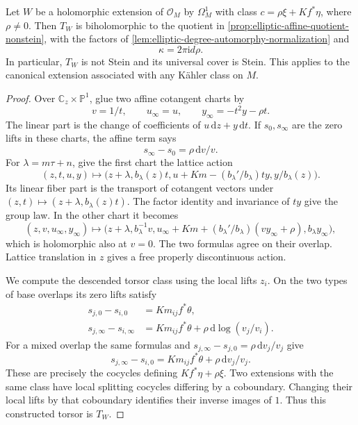 \begin{theorem}\label{thm:split-elliptic-cotangent-torsor}
Let $W$ be a holomorphic extension of $\mathcal O_M$ by $\Omega_M^1$ with class $c=\rho\xi+Kf^*\eta$, where $\rho\ne0$. Then $T_W$ is biholomorphic to the quotient in \cref{prop:elliptic-affine-quotient-nonstein}, with the factors of \cref{lem:elliptic-degree-automorphy-normalization} and
\[
 \kappa=2\pi\mathrm{i}d\rho.
\]
In particular, $T_W$ is not Stein and its universal cover is Stein. This applies to the canonical extension associated with any K\"ahler class on $M$.
\end{theorem}
\begin{proof}
Over $\mathbb C_z\times\mathbb P^1$, glue two affine cotangent charts by
\[
 v=1/t,\qquad u_\infty=u,\qquad
 y_\infty=-t^2y-\rho t.
\]
The linear part is the change of coefficients of $u\,\mathrm{d}z+y\,\mathrm{d}t$. If $s_0,s_\infty$ are the zero lifts in these charts, the affine term says
\[
 s_\infty-s_0=\rho\,\mathrm{d}v/v.
\]
For $\lambda=m\tau+n$, give the first chart the lattice action
\[
 (z,t,u,y)\longmapsto
 \bigl(z+\lambda,b_\lambda(z)t,
 u+Km-(b_\lambda'/b_\lambda)ty,y/b_\lambda(z)\bigr).
\]
Its linear fiber part is the transport of cotangent vectors under $(z,t)\mapsto(z+\lambda,b_\lambda(z)t)$. The factor identity and invariance of $ty$ give the group law. In the other chart it becomes
\[
 (z,v,u_\infty,y_\infty)\longmapsto
 \bigl(z+\lambda,b_\lambda^{-1}v,
 u_\infty+Km+(b_\lambda'/b_\lambda)(v y_\infty+\rho),
 b_\lambda y_\infty\bigr),
\]
which is holomorphic also at $v=0$. The two formulas agree on their overlap. Lattice translation in $z$ gives a free properly discontinuous action.

We compute the descended torsor class using the local lifts $z_i$. On the two types of base overlaps its zero lifts satisfy
\[
 \begin{aligned}
 s_{j,0}-s_{i,0}&=Km_{ij}f^*\theta,\\
 s_{j,\infty}-s_{i,\infty}
   &=Km_{ij}f^*\theta+\rho\,\mathrm{d}\log(v_j/v_i).
 \end{aligned}
\]
For a mixed overlap the same formulas and $s_{j,\infty}-s_{j,0}=\rho\,\mathrm{d}v_j/v_j$ give
\[
 s_{j,\infty}-s_{i,0}=Km_{ij}f^*\theta+\rho\,\mathrm{d}v_j/v_j.
\]
These are precisely the cocycles defining $Kf^*\eta+\rho\xi$. Two extensions with the same class have local splitting cocycles differing by a coboundary. Changing their local lifts by that coboundary identifies their inverse images of $1$. Thus this constructed torsor is $T_W$.


\end{proof}
